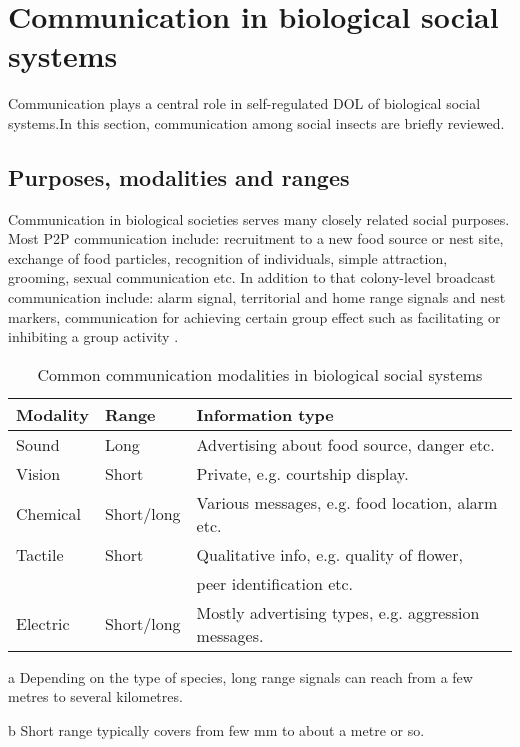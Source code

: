 \section{Communication in biological social systems}
\label{bg:bio-comm}
Communication plays a central role in self-regulated DOL of biological social systems.In this section, communication among  social insects are briefly reviewed.
%
\subsection{Purposes, modalities and ranges}
Communication in biological societies serves many closely related social purposes. Most P2P communication include: recruitment to a new food source or nest site, exchange of food particles, recognition of individuals, simple attraction, grooming, sexual communication etc. In addition to that colony-level broadcast communication include: alarm signal, territorial and home range signals and nest markers, communication for achieving certain group effect such as facilitating or inhibiting  a group activity \cite{Holldobler1990}.
\begin{table}
\caption{Common communication modalities in biological social systems}
\label{table:bio-comm-modalities}
\begin{center}
\begin{threeparttable}
\begin{tabular}{|l|l|l|}
\hline \textbf{Modality} & \textbf{Range} & \textbf{Information type}\\
\hline Sound & Long\tnote{a} & Advertising about food  source,  danger etc. \\                                                                                                                                               
\hline Vision & Short\tnote{b}  & Private, e.g. courtship display. \\
\hline Chemical  & Short/long & Various messages, e.g. food location, alarm etc.\\
\hline Tactile & Short & Qualitative info, e.g. quality of flower,\\ & & peer identification etc.\\
\hline Electric & Short/long & Mostly advertising types, e.g. aggression messages.\\
\hline
\end{tabular}
\begin{tablenotes}
\item [a]Depending on the type of species, long range signals can reach from a few metres to several kilometres.
\item [b]Short range typically covers from few mm to about a metre or so.
\end{tablenotes}
\end{threeparttable}
\end{center}
\end{table}


